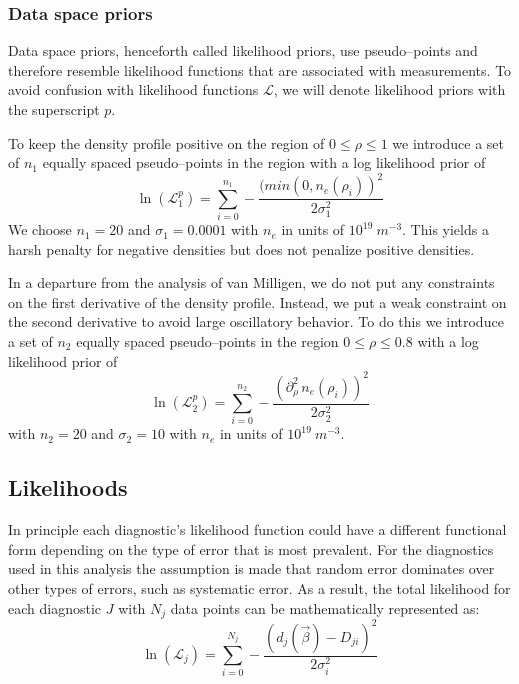 \documentclass[12pt]{article}
\numberwithin{equation}{section}
\begin{document}
\subsubsection{Data space priors}
Data space priors, henceforth called likelihood priors, use pseudo--points and therefore resemble likelihood functions that are associated with measurements. To avoid confusion with likelihood functions $\mathcal{L}$, we will denote likelihood priors with the superscript $p$. 

To keep the density profile positive on the region of $0 \le \rho \le 1$ we introduce a set of $n_1$ equally spaced pseudo--points in the region with a log likelihood prior of 
\begin{equation} \label{eq:pos_prior}
	\ln(\mathcal{L}^p_1) = \sum \limits_{i=0}^{n_1} -\frac{(min(0,n_e(\rho_i))^2}{2 \sigma_1^2}
\end{equation}  
We choose $n_1=20$ and $\sigma_1 = 0.0001$ with $n_e$ in units of $10^{19}\: m^{-3}$. This yields a harsh penalty for negative densities but does not penalize positive densities. 

In a departure from the analysis of van Milligen, we do not put any constraints on the first derivative of the density profile. Instead, we put a weak constraint on the second derivative to avoid large oscillatory behavior. To do this we introduce a set of $n_2$ equally spaced pseudo--points in the region $0 \le \rho \le 0.8$ with a log likelihood prior of
\begin{equation} \label{eq:second_prior}
	\ln(\mathcal{L}^p_2) = \sum \limits_{i=0}^{n_2}-\frac{(\partial^2_{\rho}\, n_e(\rho_i))^2}{2 \sigma_2^2}
\end{equation} 
with $n_2=20$ and $\sigma_2=10$ with $n_e$ in units of $10^{19}\: m^{-3}$. 

\subsection{Likelihoods}
In principle each diagnostic's likelihood function could have a different functional form depending on the type of error that is most prevalent. For the diagnostics used in this analysis the assumption is made that random error dominates over other types of errors, such as systematic error. As a result, the total likelihood for each diagnostic $J$ with $N_j$ data points can be mathematically represented as:
\begin{equation} \label{eq:k_like}
  \ln(\mathcal{L}_j) = \sum \limits_{i=0}^{N_j} -\frac{(d_j(\vec{\beta})-D_{ji})^2}{2 \sigma_i^2}
\end{equation}
\end{document}
